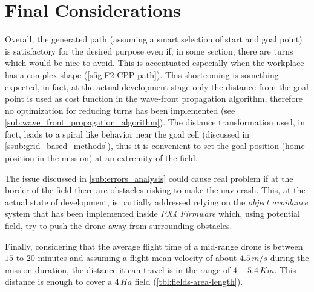 \section{Final Considerations} %
\label{sec:considerations}
Overall, the generated path (assuming a smart selection of start and goal point) is satisfactory for the desired purpose even if, in some section, there are turns which would be nice to avoid. This is accentuated especially when the workplace has a complex shape (\autoref{sfig:F2-CPP-path}). This shortcoming is something expected, in fact, at the actual development stage only the distance from the goal point is used as cost function in the wave-front propagation algorithm, therefore no optimization for reducing turns has been implemented (see \autoref{sub:wave_front_propagation_algorithm}). The distance transformation used, in fact, leads to a spiral like behavior near the goal cell (discussed in \autoref{ssub:grid_based_methods}), thus it is convenient to set the goal position (home position in the mission) at an extremity of the field. \par
The issue discussed in \autoref{sub:errors_analysis} could cause real problem if at the border of the field there are obstacles risking to make the \acrshort{uav} crash. This, at the actual state of development, is partially addressed relying on the \textit{object avoidance} system that has been implemented inside \textit{PX4 Firmware} which, using potential field, try to push the drone away from surrounding obstacles.\par
Finally, considering that the average flight time of a mid-range drone is between $15$ to $20$ minutes and assuming a flight mean velocity of about $4.5\, m/s$ during the mission duration, the distance it can travel is in the range of $4-5.4\, Km$. This distance is enough to cover a $4\, Ha$ field (\autoref{tbl:fields-area-length}).





















